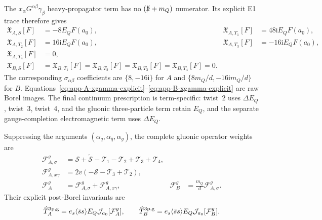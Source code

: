 \documentclass[11pt]{article}
\newcommand{\ii}{\mathrm{i}}
\newcommand{\ssbar}{\langle\bar s s\rangle}
\begin{document}
The $x_\alpha G^{\alpha\beta}\gamma_\beta$ heavy-propagator term has no
$(\slashed k+m_Q)$ numerator.  Its explicit E1 trace therefore gives
\begin{align}
 \mathfrak X_{A,S}[F]&=-8E_QF(a_0),&
 \mathfrak X_{A,T_1}[F]&=48\ii E_QF(a_0),\nonumber\\
 \mathfrak X_{A,T_2}[F]&=16\ii E_QF(a_0),&
 \mathfrak X_{A,T_3}[F]&=-16\ii E_QF(a_0),\nonumber\\
 \mathfrak X_{A,T_4}[F]&=0,
 \label{eq:app-A-xgamma-explicit}\\
 \mathfrak X_{B,S}[F]&=\mathfrak X_{B,T_1}[F]
 =\mathfrak X_{B,T_2}[F]=\mathfrak X_{B,T_3}[F]
 =\mathfrak X_{B,T_4}[F]=0 .
 \label{eq:app-B-xgamma-explicit}
\end{align}
The corresponding $\sigma_{\alpha\beta}$ coefficients are
$\{8,-16\ii\}$ for $A$ and
$\{8m_Q/d,-16\ii m_Q/d\}$ for $B$.
Equations~\eqref{eq:app-A-xgamma-explicit}--\eqref{eq:app-B-xgamma-explicit}
are raw Borel images.  The final continuum prescription is term-specific:
twist~2 uses $\Delta E_Q$, twist~3, twist~4, and the gluonic
three-particle term retain $E_Q$, and the separate gauge-completion
electromagnetic term uses $\Delta E_Q$.

Suppressing the arguments $(\alpha_q,\alpha_{\bar q},\alpha_g)$, the complete
gluonic operator weights are
\begin{align}
 \mathcal F^g_{A,\sigma}
 &=\mathcal S+\widetilde{\mathcal S}
   -\mathcal T_1-\mathcal T_2+\mathcal T_3+\mathcal T_4,\nonumber\\
 \mathcal F^g_{A,x\gamma}
 &=2v(-\mathcal S-\mathcal T_3+\mathcal T_2),\nonumber\\
 \mathcal F_A^g&=\mathcal F^g_{A,\sigma}
                 +\mathcal F^g_{A,x\gamma},&
 \mathcal F_B^g&=\frac{m_Q}{d}\mathcal F^g_{A,\sigma}.
 \label{eq:app-gluonic-weights}
\end{align}
Their explicit post-Borel invariants are
\begin{equation}
 \widehat T_A^{\rm 3p,g}
 =e_s\ssbar E_Q\mathcal J_{a_0}[\mathcal F_A^g],\qquad
 \widehat T_B^{\rm 3p,g}
 =e_s\ssbar E_Q\mathcal J_{a_0}[\mathcal F_B^g].
 \label{eq:app-gluonic-terms}
\end{equation}
\end{document}
